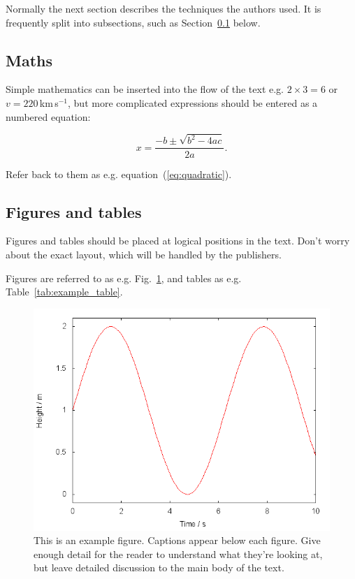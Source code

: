 \documentclass[a4paper,fleqn,usenatbib]{mnras}
\begin{document}
Normally the next section describes the techniques the authors used.
It is frequently split into subsections, such as Section~\ref{sec:maths} below.

\subsection{Maths}
\label{sec:maths} %

Simple mathematics can be inserted into the flow of the text e.g. $2\times3=6$
or $v=220$\,km\,s$^{-1}$, but more complicated expressions should be entered
as a numbered equation:

\begin{equation}
    x=\frac{-b\pm\sqrt{b^2-4ac}}{2a}.
	\label{eq:quadratic}
\end{equation}

Refer back to them as e.g. equation~(\ref{eq:quadratic}).

\subsection{Figures and tables}

Figures and tables should be placed at logical positions in the text. Don't
worry about the exact layout, which will be handled by the publishers.

Figures are referred to as e.g. Fig.~\ref{fig:example_figure}, and tables as
e.g. Table~\ref{tab:example_table}.

\begin{figure}
	\includegraphics[width=\columnwidth]{example}
    \caption{This is an example figure. Captions appear below each figure.
	Give enough detail for the reader to understand what they're looking at,
	but leave detailed discussion to the main body of the text.}
    \label{fig:example_figure}
\end{figure}
\end{document}

